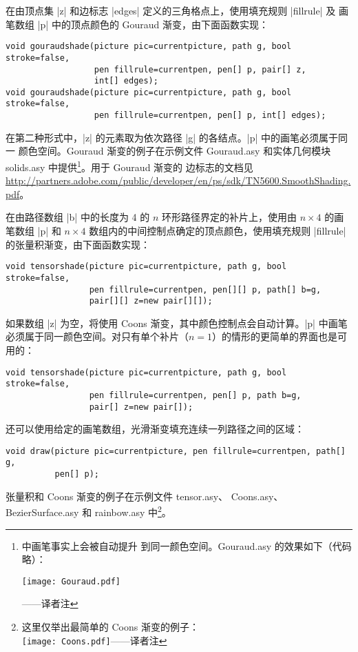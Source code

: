\documentclass[nofonts,CJKnormalspaces]{ctexbook}[2009/05/20]
\newcommand*\prgname[1]{\textsf{#1}}
\newcommand\transnote[1]{\footnote{#1——译者注}}
\begin{document}
在由顶点集 |z| 和边标志 |edges| 定义的三角格点上，使用填充规则 |fillrule| 及
画笔数组 |p| 中的顶点颜色的 Gouraud 渐变，由下面函数实现：
\begin{lstlisting}
void gouraudshade(picture pic=currentpicture, path g, bool stroke=false,
                  pen fillrule=currentpen, pen[] p, pair[] z,
                  int[] edges);
void gouraudshade(picture pic=currentpicture, path g, bool stroke=false,
                  pen fillrule=currentpen, pen[] p, int[] edges);
\end{lstlisting}
在第二种形式中，|z| 的元素取为依次路径 |g| 的各结点。|p| 中的画笔必须属于同一
颜色空间。Gouraud 渐变的例子在示例文件 \prgname{Gouraud.asy} 和实体几何模块
\prgname{solids.asy} 中提供\transnote{ 中画笔事实上会被自动提升
到同一颜色空间。\prgname{Gouraud.asy} 的效果如下（代码略）：\\
\centerline{\texttt{[image: Gouraud.pdf]}}}。用于 Gouraud 渐变的
边标志的文档见
\url{http://partners.adobe.com/public/developer/en/ps/sdk/TN5600.SmoothShading.pdf}。

在由路径数组 |b| 中的长度为 4 的 $n$ 环形路径界定的补片上，使用由 $n\times4$
的画笔数组 |p| 和 $n\times4$ 数组内的中间控制点确定的顶点颜色，使用填充规则
|fillrule| 的张量积渐变，由下面函数实现：
\begin{lstlisting}
void tensorshade(picture pic=currentpicture, path g, bool stroke=false,
                 pen fillrule=currentpen, pen[][] p, path[] b=g,
                 pair[][] z=new pair[][]);
\end{lstlisting}
如果数组 |z| 为空，将使用 Coons 渐变，其中颜色控制点会自动计算。|p| 中画笔
必须属于同一颜色空间。对只有单个补片（$n=1$）的情形的更简单的界面也是可用的：
\begin{lstlisting}
void tensorshade(picture pic=currentpicture, path g, bool stroke=false,
                 pen fillrule=currentpen, pen[] p, path b=g,
                 pair[] z=new pair[]);
\end{lstlisting}
还可以使用给定的画笔数组，光滑渐变填充连续一列路径之间的区域：
\begin{lstlisting}
void draw(picture pic=currentpicture, pen fillrule=currentpen, path[] g,
          pen[] p);
\end{lstlisting}
张量积和 Coons 渐变的例子在示例文件 \prgname{tensor.asy}、
\prgname{Coons.asy}、\prgname{BezierSurface.asy} 和 \prgname{rainbow.asy}
中\transnote{这里仅举出最简单的 Coons 渐变的例子：\\
\vbox{}%
\texttt{[image: Coons.pdf]}\box0}。
\end{document}
